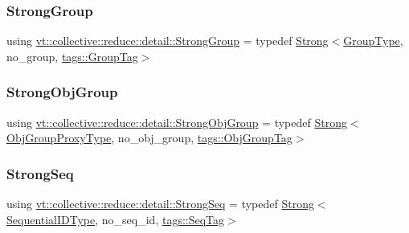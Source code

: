 \subsubsection{\texorpdfstring{Strong\+Group}{StrongGroup}}
{\footnotesize\ttfamily using \hyperlink{namespacevt_1_1collective_1_1reduce_1_1detail_adcad97800459415ff6ea4b5feb90e0f2}{vt\+::collective\+::reduce\+::detail\+::\+Strong\+Group} = typedef \hyperlink{structvt_1_1collective_1_1reduce_1_1detail_1_1_strong}{Strong}$<$\hyperlink{namespacevt_a27b5e4411c9b6140c49100e050e2f743}{Group\+Type}, no\+\_\+group, \hyperlink{structvt_1_1collective_1_1reduce_1_1detail_1_1tags_1_1_group_tag}{tags\+::\+Group\+Tag}$>$}

\mbox{\label{namespacevt_1_1collective_1_1reduce_1_1detail_afd4940b3a4ac2ef740f0e3844a09dd08}} 
\subsubsection{\texorpdfstring{Strong\+Obj\+Group}{StrongObjGroup}}
{\footnotesize\ttfamily using \hyperlink{namespacevt_1_1collective_1_1reduce_1_1detail_afd4940b3a4ac2ef740f0e3844a09dd08}{vt\+::collective\+::reduce\+::detail\+::\+Strong\+Obj\+Group} = typedef \hyperlink{structvt_1_1collective_1_1reduce_1_1detail_1_1_strong}{Strong}$<$\hyperlink{namespacevt_ad7cae989df485fccca57f0792a880a8e}{Obj\+Group\+Proxy\+Type}, no\+\_\+obj\+\_\+group, \hyperlink{structvt_1_1collective_1_1reduce_1_1detail_1_1tags_1_1_obj_group_tag}{tags\+::\+Obj\+Group\+Tag}$>$}

\mbox{\label{namespacevt_1_1collective_1_1reduce_1_1detail_affec2854d7d65bafb17eb259714e9443}} 
\subsubsection{\texorpdfstring{Strong\+Seq}{StrongSeq}}
{\footnotesize\ttfamily using \hyperlink{namespacevt_1_1collective_1_1reduce_1_1detail_affec2854d7d65bafb17eb259714e9443}{vt\+::collective\+::reduce\+::detail\+::\+Strong\+Seq} = typedef \hyperlink{structvt_1_1collective_1_1reduce_1_1detail_1_1_strong}{Strong}$<$\hyperlink{namespacevt_a3063d4db3b879d6dd2c7b8d50995c7f6}{Sequential\+I\+D\+Type}, no\+\_\+seq\+\_\+id, \hyperlink{structvt_1_1collective_1_1reduce_1_1detail_1_1tags_1_1_seq_tag}{tags\+::\+Seq\+Tag}$>$}

